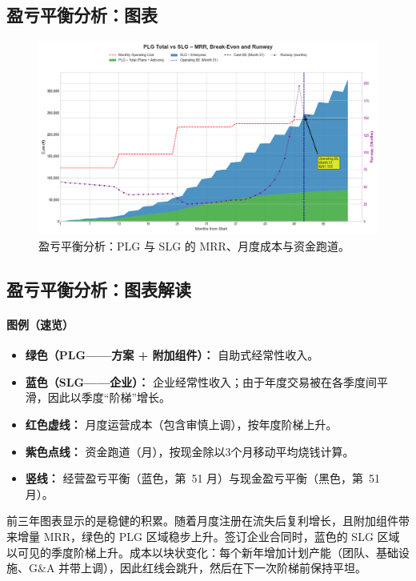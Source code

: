 \documentclass[11pt, a4paper, oneside]{article}
\begin{document}
\newpage
\subsection{盈亏平衡分析：图表}
\begin{figure}[H]
    \centering 
    \includegraphics[width=\textwidth]{financial_projection.png}
    \caption{盈亏平衡分析：PLG 与 SLG 的 MRR、月度成本与资金跑道。}
    \label{fig:break_even_analysis}
\end{figure} 
\subsection{盈亏平衡分析：图表解读}

\paragraph{图例（速览）}
\begin{itemize}
  \item \textbf{绿色（PLG——方案 + 附加组件）：} 自助式经常性收入。
  \item \textbf{蓝色（SLG——企业）：} 企业经常性收入；由于年度交易被在各季度间平滑，因此以季度“阶梯”增长。
  \item \textbf{红色虚线：} 月度运营成本（包含审慎上调），按年度阶梯上升。
  \item \textbf{紫色点线：} 资金跑道（月），按现金除以3个月移动平均烧钱计算。
  \item \textbf{竖线：} 经营盈亏平衡（蓝色，第~51 月）与现金盈亏平衡（黑色，第~51 月）。
\end{itemize}

前三年图表显示的是稳健的积累。随着月度注册在流失后复利增长，且附加组件带来增量 MRR，绿色的 PLG 区域稳步上升。签订企业合同时，蓝色的 SLG 区域以可见的季度阶梯上升。成本以块状变化：每个新年增加计划产能（团队、基础设施、G\&A 并带上调），因此红线会跳升，然后在下一次阶梯前保持平坦。
\end{document}
